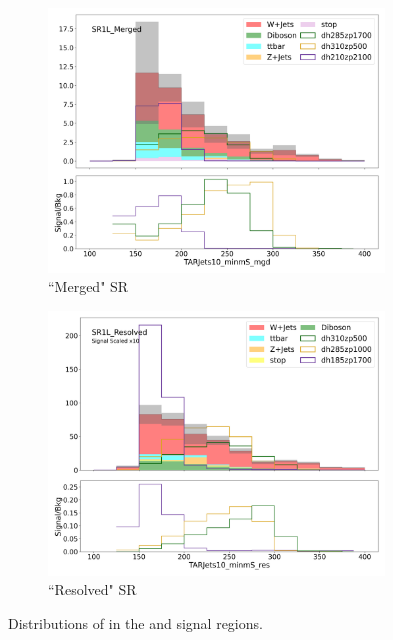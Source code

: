 \begin{figure}[htbp]
  \centering

     \begin{subfigure}{0.49\textwidth}
     \includegraphics[width = 0.98\textwidth]{Figures/5/ms/SR1L_Merged/TARJets10_minmS_mgd.png}
     \caption{``Merged" SR}
     \end{subfigure}
     \begin{subfigure}{0.49\textwidth}
     \includegraphics[width = 0.98\textwidth]{Figures/5/ms/SR1L_Resolved/TARJets10_minmS_res.png}
     \caption{``Resolved" SR}
     \end{subfigure}

     \caption{Distributions of \minms in the \merged and \resolved signal regions.}
     \label{fig:ms}
  \end{figure}
\FloatBarrier
